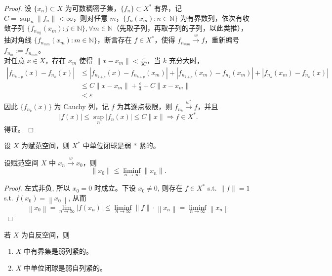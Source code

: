 \documentclass[lang=cn,newtx,10pt,scheme=chinese,thmcnt=chapter]{elegantbook}
\begin{document}
\begin{proof}
设 $\{x_n\} \subset X$ 为可数稠密子集，$\{f_n\} \subset X^*$ 有界，记 $C = \sup_n \|f_n\| < \infty$，则对任意 $m$，$\{f_n(x_m) : n \in \mathbb{N}\}$ 为有界数列，依次有收敛子列 $\{f_{n_{mj}}(x_m) : j \in \mathbb{N}\}, \forall m \in \mathbb{N}$（先取子列，再取子列的子列，以此类推），抽对角线 $\{f_{n_{mm}}(x_m) : m \in \mathbb{N}\}$，断言存在 $f \in X^*$，使得 $f_{n_{mm}} \xrightarrow{w} f$，重新编号 $f_{n_m} := f_{n_{mm}}$。\\
对任意 $x \in X$，存在 $x_m$ 使得 $\|x - x_m\| < \frac{\varepsilon}{3C}$，当 $k$ 充分大时，
\[
\begin{aligned}
\left| f_{n_{k+p}}(x) - f_{n_k}(x) \right| &\leqslant \left| f_{n_{k+p}}(x) - f_{n_{k+p}}(x_m) \right| + \left| f_{n_{k+p}}(x_m) - f_{n_k}(x_m) \right| + \left| f_{n_k}(x_m) - f_{n_k}(x) \right| \\
&\leqslant C \|x - x_m\| + \frac{\varepsilon}{3} + C \|x - x_m\| \\
&< \varepsilon
\end{aligned}
\]
因此 $\{f_{n_k}(x)\}$ 为 Cauchy 列，记 $f$ 为其逐点极限，则 $f_{n_k} \xrightarrow{w^*} f$，并且
\[
|f(x)| \leqslant \sup_n |f_n(x)| \leqslant C \|x\| \Rightarrow f \in X^*.
\]
得证。
\end{proof}

\begin{theorem}[Alaoglu 定理]
设 $X$ 为赋范空间，则 $X^*$ 中单位闭球是弱 * 紧的。
\end{theorem}

\begin{lemma}
设赋范空间 $X$ 中 $x_n \xrightarrow{w} x_0$，则
\[
\|x_0\| \leqslant \liminf_{n \to \infty} \|x_n\|.
\]
\end{lemma}

\begin{proof}
左式非负, 所以 $x_0=0$ 时成立。下设 $x_0 \neq 0$, 则存在 $f \in X^*$ s.t. $\|f\|=1$ s.t. $f\left(x_0\right)=\left\|x_0\right\|$, 从而
\begin{equation*}
\left\|x_0\right\|=\lim _{n \rightarrow \infty}\left|f\left(x_n\right)\right| \leqslant \liminf _{n \rightarrow \infty}\|f\| \cdot\left\|x_n\right\|=\liminf _{n \rightarrow \infty}\left\|x_n\right\|
\end{equation*}

\end{proof}

\begin{theorem}
若 $X$ 为自反空间，则
\begin{enumerate}
  \item $X$ 中有界集是弱列紧的。
  \item $X$ 中单位闭球是弱自列紧的。
\end{enumerate}
\end{theorem}
\end{document}
